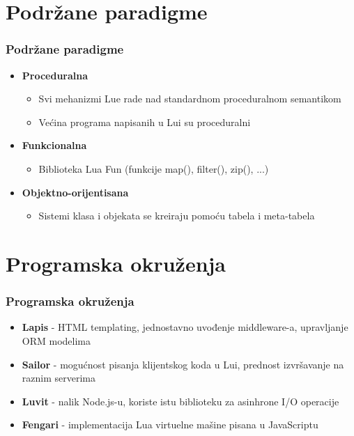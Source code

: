\documentclass{beamer}
\begin{document}
\section{Podržane paradigme}
\begin{frame}
\frametitle{Podržane paradigme}

\begin{itemize}

\item \textbf{Proceduralna}
\begin{itemize}
\item Svi mehanizmi Lue rade nad standardnom proceduralnom semantikom
\item Većina programa napisanih u Lui su proceduralni
\end{itemize}

\item \textbf{Funkcionalna}
\begin{itemize}
\item Biblioteka Lua Fun (funkcije map(), filter(), zip(), ...)
\end{itemize}

\item \textbf{Objektno-orijentisana}
\begin{itemize}
\item Sistemi klasa i objekata se kreiraju pomoću tabela i meta-tabela
\end{itemize}


\end{itemize}

\end{frame}



\section{Programska okruženja}
\begin{frame} 
\frametitle{Programska okruženja}

\begin{itemize}
\item \textbf{Lapis} - HTML templating, jednostavno uvođenje middleware-a, upravljanje ORM modelima 

\item \textbf{Sailor} - mogućnost pisanja klijentskog koda u Lui, prednost izvršavanje na raznim serverima

\item \textbf{Luvit} - nalik Node.js-u, koriste istu biblioteku za asinhrone I/O operacije

\item \textbf{Fengari} - implementacija Lua virtuelne mašine pisana u JavaScriptu

\end{itemize}

\end{frame}
\end{document}
